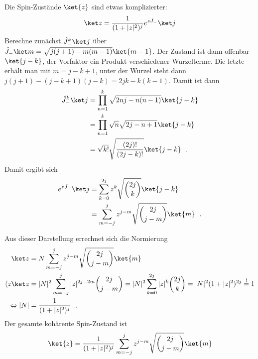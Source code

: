 Die Spin-Zustände $\ket{z}$ sind etwas komplizierter:
\begin{align*}
  \ket z = \frac{1}{(1+|z|^2)^j}e^{z\hat J_-}\ket j
\end{align*}
Berechne zunächst $\hat J_-^k\ket j$ über $\hat J_-\ket m = \sqrt{j(j+1) - m(m-1)}\ket{m-1}$.
Der Zustand ist dann offenbar $\ket{j-k}$, der Vorfaktor ein Produkt verschiedener Wurzelterme.
Die letzte erhält man mit $m=j-k+1$, unter der Wurzel steht dann $j(j+1) - (j-k+1)(j-k) = 2jk -k(k-1)$. Damit ist dann
\begin{align*}
  \hat J_-^k\ket j&= \prod\limits_{n=1}^{k} \sqrt{2nj-n(n-1)} \ket{j-k}\\
  &= \prod\limits_{n=1}^{k} \sqrt{n}\sqrt{2j-n+1} \ket{j-k}\\
  &= \sqrt{k!} \sqrt{\frac{(2j)!}{(2j-k)!}}\ket{j-k}~~.
\end{align*}
Damit ergibt sich 
\begin{align*}
  e^{ z \hat J_-}\ket j&= \sum\limits_{k=0}^{2j} z^{k} \sqrt{\binom{2j}{k}} \ket{j-k}\\
  &= \sum\limits_{m=-j}^{j} z^{j-m} \sqrt{\binom{2j}{j-m}} \ket{m}~~.
\end{align*}

Aus dieser Darstellung errechnet sich die Normierung 
\begin{align*}
  \ket z &= N \sum\limits_{m=-j}^{j} z^{j-m} \sqrt{\binom{2j}{j-m}} \ket{m}\\
  \langle z \ket z  &= |N|^2 \sum\limits_{m=-j}^{j} |z|^{2j-2m} \binom{2j}{j-m} = |N|^2 \sum\limits_{k=0}^{2j} |z|^{k} \binom{2j}{k}=|N|^2 (1+|z|^2)^{2j} \overset{!}{=} 1\\
  \Leftrightarrow |N| &= \frac{1}{(1+|z|^2)^j}~~.
\end{align*}
Der gesamte kohärente Spin-Zustand ist
\begin{align}
 \ket{z} = \frac{1}{(1+|z|^2)^j}\sum\limits_{m=-j}^{j} z^{j-m} \sqrt{\binom{2j}{j-m}} \ket{m}
\end{align}

